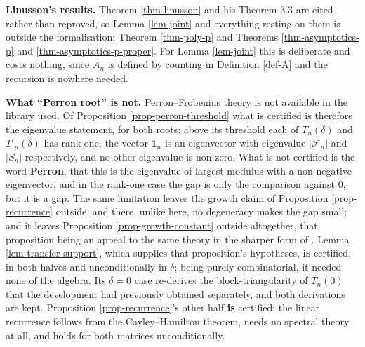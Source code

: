 \documentclass[11pt, a4paper, abstract=yes]{scrartcl}
\theoremstyle{definition}
\theoremstyle{remark}
\theoremstyle{plain}
\newcommand{\vek}[1]{\boldsymbol{#1}}
\let\autocite\cite
\begin{document}
\begin{itemize}
\textbf{Linusson's results.} Theorem \ref{thm-linusson} and his Theorem 3.3 are cited rather than reproved,
so Lemma \ref{lem-joint} and everything resting on them is outside the formalisation: Theorem
\ref{thm-poly-p} and Theorems \ref{thm-asymptotics-p} and \ref{thm-asymptotics-p-proper}. For Lemma
\ref{lem-joint} this is deliberate and costs nothing, since \(A_n\) is defined by counting in
Definition \ref{def-A} and the recursion is nowhere needed.

\textbf{What ``Perron root'' is not.} Perron--Frobenius theory is not available in the library used. Of
Proposition \ref{prop-perron-threshold} what is certified is therefore the eigenvalue statement, for
both roots: above its threshold each of \(T_n(\delta)\) and \(T'_n(\delta)\) has rank one, the vector
\(\vek 1_n\) is an eigenvector with eigenvalue \(\lvert\mathcal F_n\rvert\) and
\(\lvert S_n\rvert\) respectively, and no other eigenvalue is non-zero. What is not certified is
the word \textbf{Perron},
that this is the eigenvalue of largest modulus with a non-negative eigenvector, and in the
rank-one case the gap is only the comparison against \(0\), but it is a gap. The same limitation
leaves the growth claim of Proposition \ref{prop-recurrence} outside, and there, unlike here, no
degeneracy makes the gap small; and it leaves Proposition \ref{prop-growth-constant} outside
altogether, that proposition being an appeal to the same theory in the sharper form of
\autocite[Theorem V.7]{FlajoletSedgewick2009}. Lemma \ref{lem-transfer-support}, which supplies that
proposition's hypotheses, \textbf{is} certified, in both halves and unconditionally in \(\delta\);
being purely combinatorial, it needed none of the algebra. Its \(\delta=0\) case re-derives the
block-triangularity of \(T_n(0)\) that the development had previously obtained separately, and
both derivations are kept. Proposition \ref{prop-recurrence}'s other half \textbf{is} certified: the linear recurrence
follows from the Cayley--Hamilton theorem, needs no spectral theory at all, and holds for both
matrices unconditionally.


\end{itemize}
\end{document}

